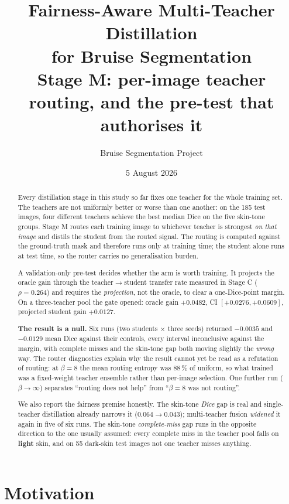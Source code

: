 \documentclass[11pt,a4paper]{article}
\title{\textbf{Fairness-Aware Multi-Teacher Distillation\\for Bruise Segmentation}\\[2mm]
\large Stage M: per-image teacher routing, and the pre-test that authorises it}
\author{Bruise Segmentation Project}
\date{5 August 2026}
\begin{document}
\maketitle

\begin{abstract}
\noindent
Every distillation stage in this study so far fixes one teacher for the whole
training set. The teachers are not uniformly better or worse than one another:
on the 185 test images, four different teachers achieve the best median Dice on
the five skin-tone groups. Stage M routes each training image to whichever
teacher is strongest \emph{on that image} and distils the student from the routed
signal. The routing is computed against the ground-truth mask and therefore runs
only at training time; the student alone runs at test time, so the router carries
no generalisation burden.

A validation-only pre-test decides whether the arm is worth training. It projects
the oracle gain through the teacher$\to$student transfer rate measured in Stage C
($\rho = 0.264$) and requires the \emph{projection}, not the oracle, to clear a
one-Dice-point margin. On a three-teacher pool the gate opened:
oracle gain $+0.0482$, CI $[+0.0276, +0.0609]$, projected student gain $+0.0127$.

\textbf{The result is a null.} Six runs (two students $\times$ three seeds)
returned $-0.0035$ and $-0.0129$ mean Dice against their controls, every interval
inconclusive against the margin, with complete misses and the skin-tone gap both
moving slightly the \emph{wrong} way. The router diagnostics explain why the
result cannot yet be read as a refutation of routing: at $\beta = 8$ the mean
routing entropy was 88\,\% of uniform, so what trained was a fixed-weight teacher
ensemble rather than per-image selection. One further run ($\beta \to \infty$)
separates ``routing does not help'' from ``$\beta = 8$ was not routing''.

We also report the fairness premise honestly. The skin-tone \emph{Dice} gap is
real and single-teacher distillation already narrows it ($0.064 \to 0.043$);
multi-teacher fusion \emph{widened} it again in five of six runs. The skin-tone
\emph{complete-miss} gap runs in the opposite direction to the one usually
assumed: every complete miss in the teacher pool falls on \textbf{light} skin,
and on 55 dark-skin test images not one teacher misses anything.
\end{abstract}

\section{Motivation}
\end{document}
